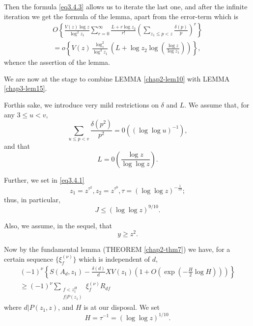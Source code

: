 Then the formula \eqref{eq3.4.3} allows us to iterate the last one, and after
the infinite iteration we get the formula of the lemma, apart from
the error-term which is 
\begin{multline*}
   O\left\{\frac{V(z) \log z}{\log^2 z_1} \sum^\infty_{r = 0} \frac{L + r
    \log z_2}{r!} \left(\sum_{z_1 \leq p < z} \frac{\delta
    (p)}{p}\right)^r\right\}\\  
  = o\left\{V (z) \frac{\log^2_z}{\log^3 z_1} \left(L + \log z_2 \log
  \left(\frac{\log z}{\log z_1}\right)\right)\right\},  
\end{multline*}
whence the assertion of the lemma.

We are now at the stage to combine LEMMA \ref{chap2-lem10} with LEMMA
\ref{chap3-lem15}. 

For\pageoriginale this sake, we introduce very mild restrictions on $\delta$ and
$L$. We assume that, for any $3 \leq u < v$,  
\begin{equation*}
  \sum_{u \leq p < v} \frac{\delta (p^2)}{p^2} = 0 ((\log \log
  u)^{-1}), \tag{3.4.8} \label{eq3.4.8}
\end{equation*}
and that
\begin{equation*}
  L =  0\left(\frac{\log z}{\log \log z}\right). \tag{3.4.9}\label{eq3.4.9}
\end{equation*}

Further, we set in \eqref{eq3.4.1}
\begin{equation*}
  z_1 = z^{\tau^2}, z_2 = z^{\tau^9}, \tau = (\log \log z)^{-
    \frac{1}{10}}; \tag{3.4.10} \label{eq3.4.10}
\end{equation*}
thus, in particular,
\begin{equation*}
J \leq (\log \log z)^{9/10}. \tag{3.4.11}\label{eq3.4.11}
\end{equation*}

Also, we assume, in the sequel, that
\begin{equation*}
y \geq z^2. \tag{3.4.12}\label{eq3.4.12}
\end{equation*}

Now by the fundamental lemma (THEOREM \ref{chap2-thm7}) we have, for a
certain sequence $\{ \xi^{(\nu)}_f  \}$ which is independent of $d$, 
\begin{equation*}
  \begin{aligned}
    (-1)^{\nu} \left\{ S(A_d, z_1) - \frac{\delta (d)}{d}XV (z_1) \left(1 + O
    \left(\exp \left( - \frac{H}{2} \log H \right)\right)\right)
    \right\} \\
    \geq (-1)^{\nu} \sum_{\substack{f < z^{H}_1 \\ f | P(z_1)}}
    \xi^{(\nu)}_f R_{df}\hspace{2cm}
  \end{aligned}\tag{3.4.13}\label{eq3.4.13}  
\end{equation*}
where $d | P (z_1, z)$, and $H$ is at our disposal. We set
$$
H= \tau^{-1} = (\log \log z)^{1/10}.
$$

